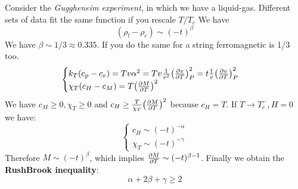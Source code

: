 \documentclass[../main/main.tex]{subfiles}
\begin{document}
Consider the \emph{Guggheneim experiment}, in which we have a liquid-gas. Different sets of data fit the  same function if you rescale \( T/T_c \)
We have
\begin{equation}
  (\rho _l - \rho _c) \sim (-t)^{\beta}
  \label{eq:}
\end{equation}
We have \( \beta \sim 1/3 \approx 0.335 \). If you do the same for a string ferromagnetic is 1/3 too.
\begin{equation}
  \begin{cases}
   k_T (c_p-c_v)=T v \alpha ^2 = T v \frac{1}{v^2} \qty(\pdv{v}{T} )^2_P = t \frac{1}{v} \qty(\pdv{v}{T} )^2_P  \\
   \chi _T (c_H-c_M) = T \qty(\pdv{M}{T} )^2
  \end{cases}
\label{eq:}
\end{equation}
We have \( c_M \geq 0, \chi _T \geq 0  \) and  \(  c_H \geq \frac{T}{\chi _T} \qty(\pdv{M}{T} )^2 \) because \( c_H = T \). If \( T \rightarrow T_c^-, H=0 \) we have:
\begin{equation}
  \begin{cases}
   c_H \sim (-t)^{-\alpha }\\
   \chi _T \sim (-t)^{-\gamma  }
  \end{cases}
\label{eq:}
\end{equation}
Therefore \( M \sim (-t)^{\beta } \), which implies \( \pdv{M}{T} \sim (-t)^{\beta -1} \). Finally we obtain the \textbf{RushBrook inequality}:
\begin{equation}
  \alpha + 2 \beta  + \gamma \geq 2
  \label{eq:}
\end{equation}
\end{document}
